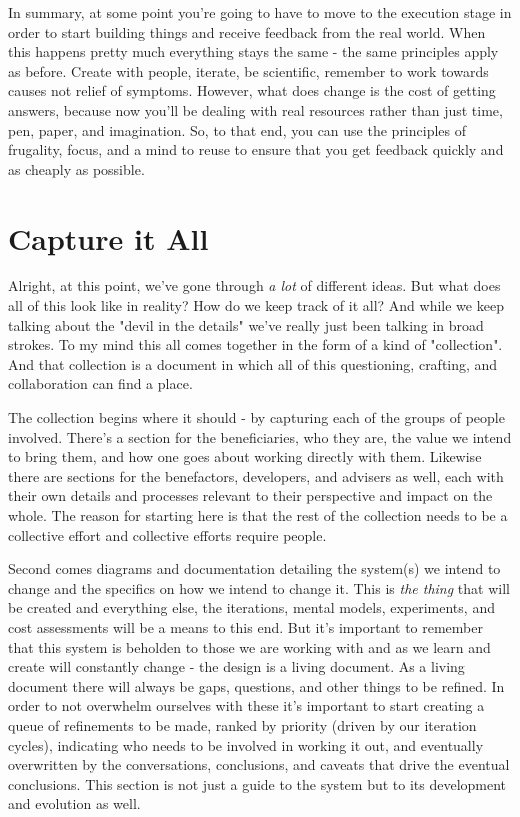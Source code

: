 \documentclass[11pt,a5paper]{book}
\begin{document}
In summary, at some point you're going to have to move to the execution stage in order to start building things and receive feedback from the real world. When this happens pretty much everything stays the same - the same principles apply as before. Create with people, iterate, be scientific, remember to work towards causes not relief of symptoms. However, what does change is the cost of getting answers, because now you'll be dealing with real resources rather than just time, pen, paper, and imagination. So, to that end, you can use the principles of frugality, focus, and a mind to reuse to ensure that you get feedback quickly and as cheaply as possible. 

\section{Capture it All}
Alright, at this point, we've gone through \textit{a lot} of different ideas. But what does all of this look like in reality? How do we keep track of it all? And while we keep talking about the "devil in the details" we've really just been talking in broad strokes. To my mind this all comes together in the form of a kind of "collection". And that collection is a document in which all of this questioning, crafting, and collaboration can find a place.
\newline

The collection begins where it should - by capturing each of the groups of people involved. There's a section for the beneficiaries, who they are, the value we intend to bring them, and how one goes about working directly with them. Likewise there are sections for the benefactors, developers, and advisers as well, each with their own details and processes relevant to their perspective and impact on the whole. The reason for starting here is that the rest of the collection needs to be a collective effort and collective efforts require people.
\newline

Second comes diagrams and documentation detailing the system(s) we intend to change and the specifics on how we intend to change it. This is \textit{the thing} that will be created and everything else, the iterations, mental models, experiments, and cost assessments will be a means to this end. But it's important to remember that this system is beholden to those we are working with and as we learn and create will constantly change - the design is a living document. As a living document there will always be gaps, questions, and other things to be refined. In order to not overwhelm ourselves with these it's important to start creating a queue of refinements to be made, ranked by priority (driven by our iteration cycles), indicating who needs to be involved in working it out, and eventually overwritten by the conversations, conclusions, and caveats that drive the eventual conclusions. This section is not just a guide to the system but to its development and evolution as well.
\newline
\end{document}
